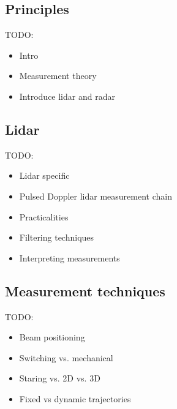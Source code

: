 \subsection{Principles}
\label{sec:intro_rs_principles}

TODO:
\begin{itemize}
\color{red}
    \item Intro
    \item Measurement theory
    \item Introduce lidar and radar
\end{itemize}


\clearpage
\subsection{Lidar}
\label{sec:intro_lidar}

TODO:
\begin{itemize}
\color{red}
    \item Lidar specific 
    \item Pulsed Doppler lidar measurement chain
    \item Practicalities
    \item Filtering techniques
    \item Interpreting measurements
\end{itemize}


\clearpage
\subsection{Measurement techniques}
\label{sec:intro_meas_tech}

TODO:
\begin{itemize}
\color{red}
    \item Beam positioning
    \item Switching vs. mechanical
    \item Staring vs. 2D vs. 3D
    \item Fixed vs dynamic trajectories
\end{itemize}




\clearpage